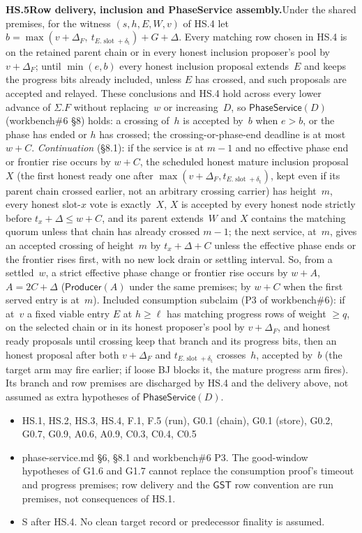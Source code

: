 \documentclass{article}
\newcommand{\slot}{\operatorname{slot}}
\newcommand{\dagnode}[6]{%
\par\medskip\noindent\textbf{#1\enspace #2.}\enspace #3
\begin{itemize}[leftmargin=2.2em,itemsep=0pt,topsep=2pt]
\item[\emph{Uses}] #4
\item[\emph{Evid.}] #5
\item[\emph{Task}] #6
\end{itemize}}
\begin{document}
\dagnode{HS.5}{Row delivery, inclusion and PhaseService assembly}{Under the shared
premises, for the witness $(s,h,E,W,v)$ of HS.4 let
$b=\max(v+\Delta_F,\ t_{E.\slot+\delta_{\mathrm t}})+G+\Delta$.  Every matching
row chosen in HS.4 is on the retained parent chain or in every honest
inclusion proposer's pool by $v+\Delta_F$; until $\min(e,b)$ every honest
inclusion proposal extends~$E$ and keeps the progress bits already included,
unless $E$ has crossed, and such proposals are accepted and relayed.  These
conclusions and HS.4 hold across every lower advance of $\Sigma.F$ without
replacing~$w$ or increasing~$D$, so $\mathsf{PhaseService}(D)$ (workbench\#6
\S8) holds: a crossing of~$h$ is accepted by~$b$ when $e>b$, or the phase has
ended or $h$ has crossed; the crossing-or-phase-end deadline is at most
$w+C$.  \emph{Continuation} (\S8.1): if the service is at $m-1$ and no
effective phase end or frontier rise occurs by $w+C$, the scheduled honest
mature inclusion proposal~$X$ (the first honest ready one after
$\max(v+\Delta_F,t_{E.\slot+\delta_{\mathrm t}})$, kept even if its parent chain
crossed earlier, not an arbitrary crossing carrier) has height~$m$, every
honest slot-$x$ vote is exactly~$X$, $X$ is accepted by every honest node
strictly before $t_x+\Delta\leq w+C$, and its parent extends~$W$ and $X$
contains the matching quorum unless that chain has already crossed $m-1$; the
next service, at~$m$, gives an accepted crossing of height~$m$ by
$t_x+\Delta+C$ unless the effective phase ends or the frontier rises first, with
no new lock drain or settling interval.  So, from a settled~$w$, a strict
effective phase change or frontier rise occurs by $w+A$, $A=2C+\Delta$
($\mathsf{Producer}(A)$ under the same premises; by $w+C$ when the first
served entry is at~$m$).  Included consumption subclaim (P3 of
workbench\#6): if at~$v$ a fixed viable entry $E$ at $h\geq\ell$ has matching
progress rows of weight $\geq q$, on the selected chain or in its honest
proposer's pool by $v+\Delta_F$, and honest ready proposals until crossing
keep that branch and its progress bits, then an honest proposal after both
$v+\Delta_F$ and $t_{E.\slot+\delta_{\mathrm t}}$ crosses~$h$, accepted by~$b$
(the target arm may fire earlier; if loose BJ blocks it, the mature progress
arm fires).  Its branch and row premises are discharged by HS.4 and the
delivery above, not assumed as extra hypotheses of $\mathsf{PhaseService}(D)$.}
{HS.1, HS.2, HS.3, HS.4, F.1, F.5 (run), G0.1 (chain), G0.1 (store), G0.2, G0.7,
G0.9, A0.6, A0.9, C0.3, C0.4, C0.5}{phase-service.md \S6, \S8.1 and
workbench\#6 P3.  The good-window hypotheses of G1.6 and G1.7 cannot replace
the consumption proof's timeout and progress premises; row delivery and the
$\mathsf{GST}$ row convention are run premises, not consequences of HS.1.}{S
after HS.4.  No clean target record or predecessor finality is assumed.}
\end{document}
